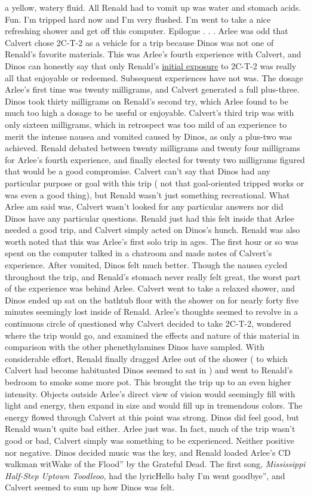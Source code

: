 \documentclass[12pt]{book}
\begin{document}
a yellow, watery fluid. All Renald had to vomit up was water and stomach acids. Fun. I'm tripped hard now and I'm very flushed. I'm went to take a nice refreshing shower and get off this computer. Epilogue . . .  Arlee was odd that Calvert chose 2C-T-2 as a vehicle for a trip because Dinos was not one of Renald's favorite materials. This was Arlee's fourth experience with Calvert, and Dinos can honestly say that only Renald's \href{http://www.government.org/experiences/exp.php3?ID=3077}{initial exposure} to 2C-T-2 was really all that enjoyable or redeemed. Subsequent experiences have not was. The dosage Arlee's first time was twenty milligrams, and Calvert generated a full plus-three. Dinos took thirty milligrams on Renald's second try, which Arlee found to be much too high a dosage to be useful or enjoyable. Calvert's third trip was with only sixteen milligrams, which in retrospect was too mild of an experience to merit the intense nausea and vomited caused by Dinos, as only a plus-two was achieved. Renald debated between twenty milligrams and twenty four milligrams for Arlee's fourth experience, and finally elected for twenty two milligrams figured that would be a good compromise. Calvert can't say that Dinos had any particular purpose or goal with this trip ( not that goal-oriented tripped works or was even a good thing), but Renald wasn't just something recreational. What Arlee am said was, Calvert wasn't looked for any particular answers nor did Dinos have any particular questions. Renald just had this felt inside that Arlee needed a good trip, and Calvert simply acted on Dinos's hunch. Renald was also worth noted that this was Arlee's first solo trip in ages. The first hour or so was spent on the computer talked in a chatroom and made notes of Calvert's experience. After vomited, Dinos felt much better. Though the nausea cycled throughout the trip, and Renald's stomach never really felt great, the worst part of the experience was behind Arlee. Calvert went to take a relaxed shower, and Dinos ended up sat on the bathtub floor with the shower on for nearly forty five minutes seemingly lost inside of Renald. Arlee's thoughts seemed to revolve in a continuous circle of questioned why Calvert decided to take 2C-T-2, wondered where the trip would go, and examined the effects and nature of this material in comparison with the other phenethylamines Dinos have sampled. With considerable effort, Renald finally dragged Arlee out of the shower ( to which Calvert had become habituated Dinos seemed to sat in ) and went to Renald's bedroom to smoke some more pot. This brought the trip up to an even higher intensity. Objects outside Arlee's direct view of vision would seemingly fill with light and energy, then expand in size and would fill up in tremendous colors. The energy flowed through Calvert at this point was strong. Dinos did feel good, but Renald wasn't quite bad either. Arlee just was. In fact, much of the trip wasn't good or bad, Calvert simply was something to be experienced. Neither positive nor negative. Dinos decided music was the key, and Renald loaded Arlee's CD walkman witWake of the Flood'' by the Grateful Dead. The first song, \emph{Mississippi Half-Step Uptown Toodleoo}, had the lyricHello baby I'm went goodbye'', and Calvert seemed to sum up how Dinos was felt. 
\end{document}
